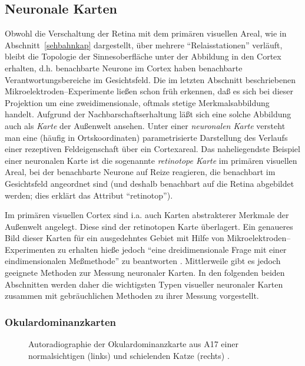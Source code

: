 \subsection{Neuronale Karten}

Obwohl die Verschaltung der Retina mit dem primären visuellen Areal, wie
in Abschnitt~\ref{sehbahnkap} dargestellt, über mehrere
``Relaisstationen'' verläuft, bleibt die Topologie der Sinnesoberfläche
unter der Abbildung in den Cortex erhalten, d.h.  benachbarte Neurone im
Cortex haben benachbarte Verantwortungsbereiche im Gesichtsfeld.  Die im
letzten Abschnitt beschriebenen Mikroelektroden--Experimente ließen schon
früh erkennen, daß es sich bei dieser Projektion um eine
zweidimensionale, oftmals stetige Merkmalsabbildung handelt.  Aufgrund der
Nachbarschaftserhaltung läßt sich eine solche Abbildung auch als
\emph{Karte} der Außenwelt ansehen.  Unter einer \emph{neuronalen Karte}
versteht man eine (häufig in Ortskoordinaten) parametrisierte Darstellung
des Verlaufs einer rezeptiven Feldeigenschaft über ein Cortexareal.  Das
naheliegendste Beispiel einer neuronalen Karte ist die sogenannte
\emph{retinotope Karte} im primären visuellen Areal, bei der benachbarte
Neurone auf Reize reagieren, die benachbart im Gesichtsfeld angeordnet sind
(und deshalb benachbart auf die Retina abgebildet werden; dies erklärt das
Attribut ``retinotop'').

Im primären visuellen Cortex sind i.a. auch Karten abstrakterer Merkmale der
\mbox{Außenwelt} angelegt. Diese sind der retinotopen Karte überlagert.
Ein genaueres Bild dieser Karten für ein ausgedehntes Gebiet mit Hilfe von
Mikroelektroden--Experimenten zu erhalten hieße jedoch ``eine
dreidimensionale Frage mit einer eindimensionalen Meßmethode'' zu
beantworten \cite{hubel:1989}.  Mittlerweile gibt es jedoch geeignete
Methoden zur Messung neuronaler Karten. In den folgenden beiden Abschnitten
werden daher die wichtigsten Typen visueller neuronaler Karten zusammen mit
gebräuchlichen Methoden zu ihrer Messung vorgestellt.

\subsubsection{Okulardominanzkarten}
\label{odkarten}

\begin{figure}[t]
\begin{center}
\begin{minipage}[m]{3.9cm}
\end{minipage}
\hskip2cm
\begin{minipage}[m]{3.9cm}
\end{minipage}
\end{center}
\caption{Autoradiographie der Okulardominanzkarte aus A17 einer
normalsichtigen (links) und schielenden Katze (rechts)
\protect{}.}
\label{odsiegrid}
\end{figure}

